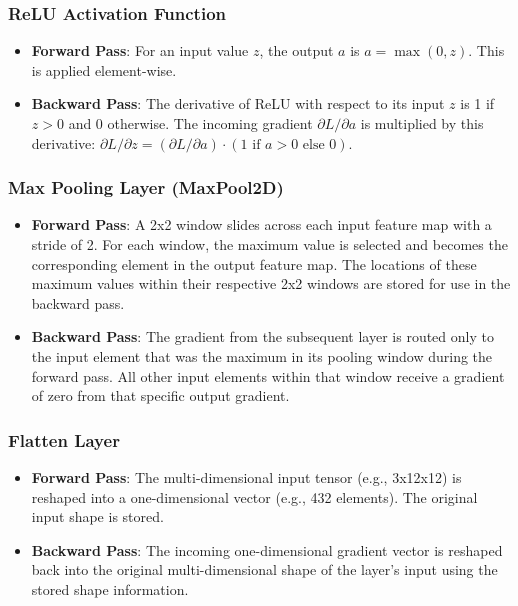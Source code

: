 \documentclass[conference]{IEEEtran}
\begin{document}
\subsubsection{ReLU Activation Function}
\begin{itemize}
    \item \textbf{Forward Pass}: For an input value $z$, the output $a$ is $a = \max(0, z)$. This is applied element-wise.
    \item \textbf{Backward Pass}: The derivative of ReLU with respect to its input $z$ is 1 if $z > 0$ and 0 otherwise. The incoming gradient $\partial L / \partial a$ is multiplied by this derivative: $\partial L / \partial z = (\partial L / \partial a) \cdot (1 \text{ if } a > 0 \text{ else } 0)$.
\end{itemize}

\subsubsection{Max Pooling Layer (MaxPool2D)}
\begin{itemize}
    \item \textbf{Forward Pass}: A 2x2 window slides across each input feature map with a stride of 2. For each window, the maximum value is selected and becomes the corresponding element in the output feature map. The locations of these maximum values within their respective 2x2 windows are stored for use in the backward pass.
    \item \textbf{Backward Pass}: The gradient from the subsequent layer is routed only to the input element that was the maximum in its pooling window during the forward pass. All other input elements within that window receive a gradient of zero from that specific output gradient.
\end{itemize}

\subsubsection{Flatten Layer}
\begin{itemize}
    \item \textbf{Forward Pass}: The multi-dimensional input tensor (e.g., 3x12x12) is reshaped into a one-dimensional vector (e.g., 432 elements). The original input shape is stored.
    \item \textbf{Backward Pass}: The incoming one-dimensional gradient vector is reshaped back into the original multi-dimensional shape of the layer's input using the stored shape information.
\end{itemize}
\end{document}
